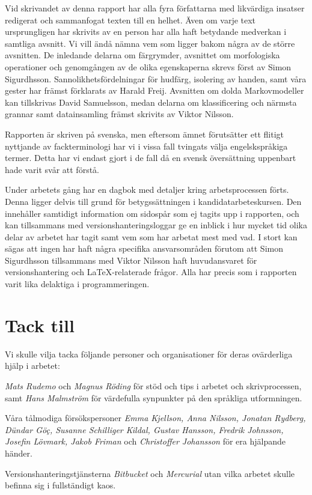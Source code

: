 \documentclass[../rapport_MVEX01-11-05]{subfiles}
\begin{document}
Vid skrivandet av denna rapport har alla fyra författarna 
med likvärdiga insatser redigerat och sammanfogat
texten till en helhet. Även om varje text ursprungligen har skrivits av en
person har alla haft betydande medverkan i samtliga avsnitt.
Vi vill ändå nämna vem som ligger bakom några av de större avsnitten.
De inledande delarna om färgrymder, avsnittet om morfologiska operationer
och genomgången av de olika egenskaperna skrevs först av Simon Sigurdhsson.
Sannolikhetsfördelningar för hudfärg, isolering av handen, samt våra gester
har främst förklarats av Harald Freij.
Avsnitten om dolda Markovmodeller kan tillskrivas David Samuelsson, medan
delarna om klassificering och närmsta grannar samt datainsamling främst skrivits av Viktor Nilsson.

Rapporten är skriven på svenska, men eftersom ämnet förutsätter ett flitigt nyttjande
av fackterminologi har vi i vissa fall tvingats välja engelskspråkiga termer.
Detta har vi endast gjort i de fall då en svensk översättning uppenbart hade
varit svår att förstå.

Under arbetets gång har en dagbok med detaljer kring arbetsprocessen
förts. Denna ligger delvis till grund för betygssättningen i
kandidatarbeteskursen. Den innehåller samtidigt information om sidospår som ej
tagits upp i rapporten, och kan tillsammans med versionshanteringsloggar ge
en inblick i hur mycket tid olika delar av arbetet har tagit samt vem som har
arbetat mest med vad. I stort kan sägas att ingen har haft några specifika
ansvarsområden förutom att Simon Sigurdhsson tillsammans med Viktor
Nilsson haft huvudansvaret för versionshantering och \LaTeX-relaterade frågor.
Alla har precis som i rapporten varit lika delaktiga i programmeringen.

\cleardoublepage
\section*{Tack till}
Vi skulle vilja tacka följande personer och organisationer för deras
ovärderliga hjälp i arbetet:

\begin{list}{}{\leftmargin=1em\rightmargin=1em}
\item \emph{Mats Rudemo} och \emph{Magnus Röding} för stöd och tips i arbetet
och skrivprocessen, samt
\emph{Hans Malmström} för värdefulla synpunkter på den språkliga utformningen.

\item Våra tålmodiga försökspersoner \emph{Emma Kjellson, Anna Nilsson,
Jonatan Rydberg, Dündar Göç, Susanne Schilliger Kildal, Gustav Hansson,
Fredrik Johnsson, Josefin Lövmark, Jakob Friman} och \emph{Christoffer
Johansson} för era hjälpande händer.

\item Versionshanteringstjänsterna \emph{Bitbucket} och \emph{Mercurial} utan vilka
arbetet skulle befinna sig i fullständigt kaos.
\end{list}
\end{document}
